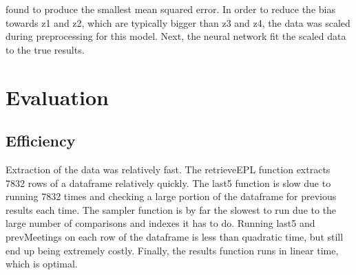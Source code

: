 \documentclass{article}
\begin{document}
found to produce the smallest mean squared error. In order to reduce the bias towards z1 and z2, which are typically bigger than z3 and z4, the data was scaled during preprocessing for this model. Next, the neural network fit the scaled data to the true results.

\section{Evaluation}
\subsection{Efficiency}
Extraction of the data was relatively fast. The retrieveEPL function extracts 7832 rows of a dataframe relatively quickly. The last5 function is slow due to running 7832 times and checking a large portion of the dataframe for previous results each time. The sampler function is by far the slowest to run due to the large number of comparisons and indexes it has to do. Running last5 and prevMeetings on each row of the dataframe is less than quadratic time, but still end up being extremely costly. Finally, the results function runs in linear time, which is optimal.
\end{document}
